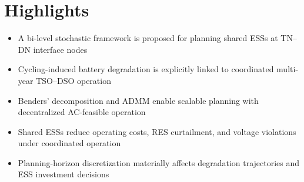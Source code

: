 \documentclass[12pt]{article}
\begin{document}
\section*{Highlights}

\begin{itemize}
    \item A bi-level stochastic framework is proposed for planning shared ESSs at TN--DN interface nodes
    \item Cycling-induced battery degradation is explicitly linked to coordinated multi-year TSO--DSO operation
    \item Benders' decomposition and ADMM enable scalable planning with decentralized AC-feasible operation
    \item Shared ESSs reduce operating costs, RES curtailment, and voltage violations under coordinated operation
    \item Planning-horizon discretization materially affects degradation trajectories and ESS investment decisions
\end{itemize}
\end{document}
